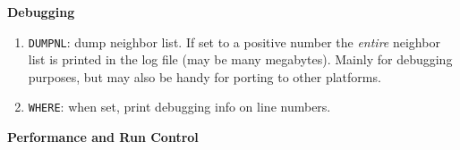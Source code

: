 {\bf Debugging}

\begin{enumerate}

\item   {\tt DUMPNL}: dump neighbor list. 
        If set to a positive number the {\em entire}
        neighbor list is printed in the log file (may be many megabytes).
        Mainly for debugging purposes, but may also be handy for
        porting to other platforms.
\item   {\tt WHERE}: when set, print debugging info on line numbers.


\end{enumerate}

{\bf Performance and Run Control}

